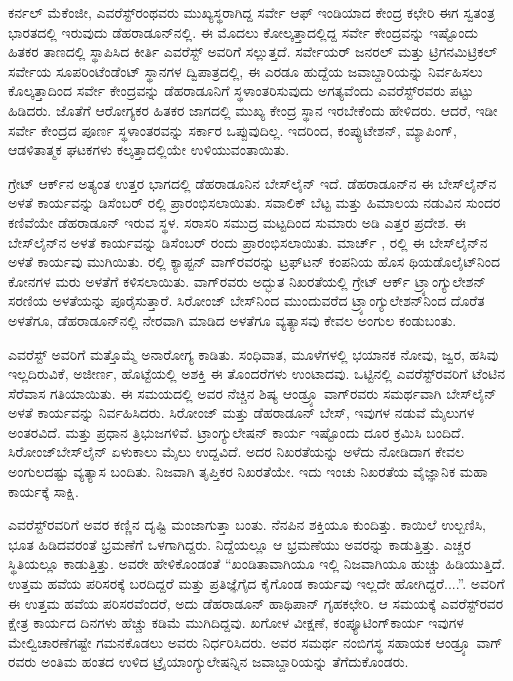 ಕರ್ನಲ್​ ಮೆಕೆಂಜೀ, ಎವರೆಸ್ಟ್​ರಂಥವರು ಮುಖ್ಯಸ್ಥರಾಗಿದ್ದ ಸರ್ವೇ ಆಫ್​ ಇಂಡಿಯಾದ ಕೇಂದ್ರ ಕಛೇರಿ ಈಗ ಸ್ವತಂತ್ರ ಭಾರತದಲ್ಲಿ ಇರುವುದು ಡೆಹರಾಡೂನ್​ನಲ್ಲಿ. ಈ ಮೊದಲು ಕೋಲ್ಕತ್ತಾದಲ್ಲಿದ್ದ ಸರ್ವೇ ಕೇಂದ್ರವನ್ನು ಇಷ್ಟೊಂದು ಹಿತಕರ ತಾಣದಲ್ಲಿ ಸ್ಥಾಪಿಸಿದ ಕೀರ್ತಿ ಎವರೆಸ್ಟ್​ ಅವರಿಗೆ ಸಲ್ಲುತ್ತದೆ. ಸರ್ವೇಯರ್​ ಜನರಲ್​ ಮತ್ತು ಟ್ರಿಗನಮಿಟ್ರಿಕಲ್​ ಸರ್ವೇಯ ಸೂಪರಿಂಟೆಂಡೆಂಟ್​ ಸ್ಥಾನಗಳ ದ್ವಿಪಾತ್ರದಲ್ಲಿ, ಈ ಎರಡೂ ಹುದ್ದೆಯ ಜವಾಬ್ದಾರಿಯನ್ನು ನಿರ್ವಹಿಸಲು ಕೊಲ್ಕತ್ತಾದಿಂದ ಸರ್ವೇ ಕೇಂದ್ರವನ್ನು ಡೆಹರಾಡೂನಿಗೆ ಸ್ಥಳಾಂತರಿಸುವುದು ಅಗತ್ಯವೆಂದು ಎವರೆಸ್ಟ್​ರವರು ಪಟ್ಟು ಹಿಡಿದರು. ಜೊತೆಗೆ ಆರೋಗ್ಯಕರ ಹಿತಕರ ಜಾಗದಲ್ಲಿ ಮುಖ್ಯ ಕೇಂದ್ರ ಸ್ಥಾನ ಇರಬೇಕೆಂದು ಹೇಳಿದರು. ಆದರೆ, ಇಡೀ ಸರ್ವೇ ಕೇಂದ್ರದ ಪೂರ್ಣ ಸ್ಥಳಾಂತರವನ್ನು ಸರ್ಕಾರ ಒಪ್ಪುವುದಿಲ್ಲ. ಇದರಿಂದ, ಕಂಪ್ಯುಟೇಶನ್​, ಮ್ಯಾಪಿಂಗ್​, ಆಡಳಿತಾತ್ಮಕ ಘಟಕಗಳು ಕಲ್ಕತ್ತಾದಲ್ಲಿಯೇ ಉಳಿಯುವಂತಾಯಿತು.

ಗ್ರೇಟ್​ ಆರ್ಕ್‌ನ ಅತ್ಯಂತ ಉತ್ತರ ಭಾಗದಲ್ಲಿ ಡೆಹರಾಡೂನಿನ ಬೇಸ್‌ಲೈನ್​ ಇದೆ. ಡೆಹರಾಡೂನ್​ನ ಈ ಬೇಸ್‌ಲೈನ್​ನ ಅಳತೆ ಕಾರ್ಯವನ್ನು ಡಿಸೆಂಬರ್​  ರಲ್ಲಿ ಪ್ರಾರಂಭಿಸಲಾಯಿತು. ಸವಾಲಿಕ್​ ಬೆಟ್ಟ ಮತ್ತು ಹಿಮಾಲಯ ನಡುವಿನ ಸುಂದರ ಕಣಿವೆಯೇ ಡೆಹರಾಡೂನ್​ ಇರುವ ಸ್ಥಳ. ಸರಾಸರಿ ಸಮುದ್ರ ಮಟ್ಟದಿಂದ ಸುಮಾರು  ಅಡಿ ಎತ್ತರ ಪ್ರದೇಶ. ಈ ಬೇಸ್‌ಲೈನ್​ನ ಅಳತೆ ಕಾರ್ಯವನ್ನು ಡಿಸೆಂಬರ್​  ರಂದು ಪ್ರಾರಂಭಿಸಲಾಯಿತು. ಮಾರ್ಚ್ ,  ರಲ್ಲಿ ಈ ಬೇಸ್‌ಲೈನ್​ನ ಅಳತೆ ಕಾರ್ಯವು ಮುಗಿಯಿತು.  ರಲ್ಲಿ ಕ್ಯಾಪ್ಟನ್​ ವಾಗ್​ರವರನ್ನು ಟ್ರಫ್​ಟನ್​ ಕಂಪನಿಯ ಹೊಸ ಥಿಯಡೊಲೈಟ್​ನಿಂದ ಕೋನಗಳ ಮರು ಅಳತೆಗೆ ಕಳಿಸಲಾಯಿತು. ವಾಗ್​ರವರು ಅದ್ಭುತ ನಿಖರತೆಯಲ್ಲಿ ಗ್ರೇಟ್​ ಆರ್ಕ್ ಟ್ರ್ಯಾಂಗ್ಯುಲೇಶನ್​ ಸರಣಿಯ ಅಳತೆಯನ್ನು ಪೂರೈಸುತ್ತಾರೆ. ಸಿರೋಂಜ್​ ಬೇಸ್​ನಿಂದ ಮುಂದುವರೆದ ಟ್ರ್ಯಾಂಗ್ಯುಲೇಶನ್​ನಿಂದ ದೊರೆತ ಅಳತೆಗೂ, ಡೆಹರಾಡೂನ್​ನಲ್ಲಿ ನೇರವಾಗಿ ಮಾಡಿದ ಅಳತೆಗೂ ವ್ಯತ್ಯಾಸವು ಕೇವಲ  ಅಂಗುಲ ಕಂಡುಬಂತು.

ಎವರೆಸ್ಟ್​ ಅವರಿಗೆ ಮತ್ತೊಮ್ಮೆ ಅನಾರೋಗ್ಯ ಕಾಡಿತು. ಸಂಧಿವಾತ, ಮೂಳೆಗಳಲ್ಲಿ ಭಯಾನಕ ನೋವು, ಜ್ವರ, ಹಸಿವು ಇಲ್ಲದಿರುವಿಕೆ, ಅಜೀರ್ಣ, ಹೊಟ್ಟೆಯಲ್ಲಿ ಅಶಕ್ತಿ ಈ ತೊಂದರೆಗಳು ಉಂಟಾದವು. ಒಟ್ಟಿನಲ್ಲಿ ಎವರೆಸ್ಟ್​ರವರಿಗೆ ಟೆಂಟಿನ ಸೆರೆವಾಸ ಗತಿಯಾಯಿತು. ಈ ಸಮಯದಲ್ಲಿ ಅವರ ನೆಚ್ಚಿನ ಶಿಷ್ಯ ಆಂಡ್ರ್ಯೂ ವಾಗ್​ರವರು ಸಮರ್ಥವಾಗಿ ಬೇಸ್​ಲೈನ್​ ಅಳತೆ ಕಾರ್ಯವನ್ನು ನಿರ್ವಹಿಸಿದರು. ಸಿರೋಂಜ್​ ಮತ್ತು ಡೆಹರಾಡೂನ್​ ಬೇಸ್​, ಇವುಗಳ ನಡುವೆ  ಮೈಲುಗಳ ಅಂತರವಿದೆ. ಮತ್ತು  ಪ್ರಧಾನ ತ್ರಿಭುಜಗಳಿವೆ. ಟ್ರಾಂಗ್ಯುಲೇಷನ್​ ಕಾರ್ಯ ಇಷ್ಟೊಂದು ದೂರ ಕ್ರಮಿಸಿ ಬಂದಿದೆ. ಸಿರೋಂಜ್​ ಬೇಸ್‌ಲೈನ್​ ಏಳುಕಾಲು ಮೈಲು ಉದ್ದವಿದೆ. ಅದರ ನಿಖರತೆಯನ್ನು ಅಳೆದು ನೋಡಿದಾಗ ಕೇವಲ  ಅಂಗುಲದಷ್ಟು ವ್ಯತ್ಯಾಸ ಬಂದಿತು. ನಿಜವಾಗಿ ತೃಪ್ತಿಕರ ನಿಖರತೆಯೇ. ಇದು ಇಂಚು ನಿಖರತೆಯ ವೈಜ್ಞಾನಿಕ ಮಹಾ ಕಾರ್ಯಕ್ಕೆ ಸಾಕ್ಷಿ.

ಎವರೆಸ್ಟ್​ರವರಿಗೆ ಅವರ ಕಣ್ಣಿನ ದೃಷ್ಟಿ ಮಂಜಾಗುತ್ತಾ ಬಂತು. ನೆನಪಿನ ಶಕ್ತಿಯೂ ಕುಂದಿತ್ತು. ಕಾಯಿಲೆ ಉಲ್ಬಣಿಸಿ, ಭೂತ ಹಿಡಿದವರಂತೆ ಭ್ರಮಣೆಗೆ ಒಳಗಾಗಿದ್ದರು. ನಿದ್ದೆಯಲ್ಲೂ ಆ ಭ್ರಮಣೆಯು ಅವರನ್ನು ಕಾಡುತ್ತಿತ್ತು. ಎಚ್ಚರ ಸ್ಥಿತಿಯಲ್ಲೂ ಕಾಡುತ್ತಿತ್ತು. ಅವರೇ ಹೇಳಿಕೊಂಡಂತೆ “ಖಂಡಿತಾವಾಗಿಯೂ ಇಲ್ಲಿ ನಿಜವಾಗಿಯೂ ಹುಚ್ಚು ಹಿಡಿಯುತ್ತಿದೆ. ಉತ್ತಮ ಹವೆಯ ಪರಿಸರಕ್ಕೆ ಬರದಿದ್ದರೆ ಮತ್ತು ಪ್ರತಿಜ್ಞೆಗೈದ ಕೈಗೊಂಡ ಕಾರ್ಯವು ಇಲ್ಲದೇ ಹೋಗಿದ್ದರೆ....”. ಅವರಿಗೆ ಈ ಉತ್ತಮ ಹವೆಯ ಪರಿಸರವೆಂದರೆ, ಅದು ಡೆಹರಾಡೂನ್​ ಹಾಥಿಪಾನ್​ ಗೃಹಕಛೇರಿ. ಆ ಸಮಯಕ್ಕೆ ಎವರೆಸ್ಟ್​ರವರ ಕ್ಷೇತ್ರ ಕಾರ್ಯದ ದಿನಗಳು ಹೆಚ್ಚು ಕಡಿಮೆ ಮುಗಿದಿದ್ದವು. ಖಗೋಳ ವೀಕ್ಷಣೆ, ಕಂಪ್ಯೂಟಿಂಗ್​ ಕಾರ್ಯ ಇವುಗಳ ಮೇಲ್ವಿಚಾರಣೆಗಷ್ಟೇ ಗಮನಕೊಡಲು ಅವರು ನಿರ್ಧರಿಸಿದರು. ಅವರ ಸಮರ್ಥ ನಂಬಿಗಸ್ಥ ಸಹಾಯಕ ಆಂಡ್ರ್ಯೂ ವಾಗ್​ರವರು ಅಂತಿಮ ಹಂತದ ಉಳಿದ ಟ್ರೈಯಾಂಗ್ಯುಲೇಷನ್ನಿನ ಜವಾಬ್ದಾರಿಯನ್ನು ತೆಗೆದುಕೊಂಡರು.

